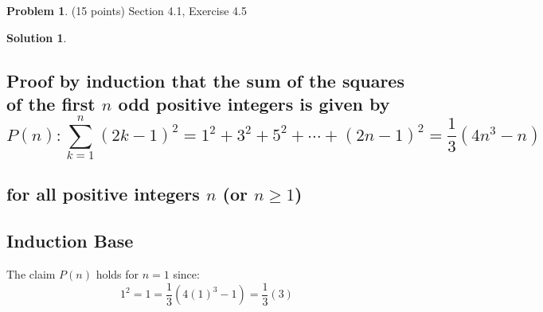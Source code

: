 \documentclass{article}
\theoremstyle{definition}
\newtheorem{problem}{Problem}
\newtheorem*{solution}{Solution}
\begin{document}
\newpage
\begin{problem} (15 points) Section 4.1, Exercise 4.5 
\end{problem}
\begin{solution}
\hspace{1cm}
\subsection*{Proof by induction that the sum of the squares of the first $n$ odd positive integers is given by\\
$$ P(n) : \sum_{k=1}^{n} (2k-1)^2 = 1^2 + 3^2 + 5^2 + \cdots + (2n-1)^2 = \frac{1}{3}(4n^3 - n)$$ \\ for all positive integers $n$ (or $n \geqslant 1$)}
\subsection*{Induction Base}
The claim $P(n)$ holds for $n = 1$ since:\\ 
$$1^2 = 1 = \frac{1}{3}(4(1)^3 - 1) = \frac{1}{3}(3)$$

\end{solution}
\end{document}
